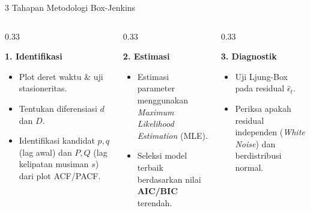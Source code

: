 \documentclass[aspectratio=169, 10pt]{beamer}
\begin{document}
\begin{frame}{3 Tahapan Metodologi Box-Jenkins}
    \begin{columns}[T]
        \begin{column}{0.33\textwidth}
            \begin{block}{\textbf{1. Identifikasi}}
                \begin{itemize}
                    \item Plot deret waktu \& uji stasioneritas.
                    \item Tentukan diferensiasi $d$ dan $D$.
                    \item Identifikasi kandidat $p, q$ (lag awal) dan $P, Q$ (lag kelipatan musiman $s$) dari plot ACF/PACF.
                \end{itemize}
            \end{block}
        \end{column}
        \begin{column}{0.33\textwidth}
            \begin{block}{\textbf{2. Estimasi}}
                \begin{itemize}
                    \item Estimasi parameter menggunakan \textit{Maximum Likelihood Estimation} (MLE).
                    \item Seleksi model terbaik berdasarkan nilai \textbf{AIC/BIC} terendah.
                \end{itemize}
            \end{block}
        \end{column}
        \begin{column}{0.33\textwidth}
            \begin{block}{\textbf{3. Diagnostik}}
                \begin{itemize}
                    \item Uji Ljung-Box pada residual $\hat{\epsilon}_t$.
                    \item Periksa apakah residual independen (\textit{White Noise}) dan berdistribusi normal.
                \end{itemize}
            \end{block}
        \end{column}
    \end{columns}
\end{frame}
\end{document}
